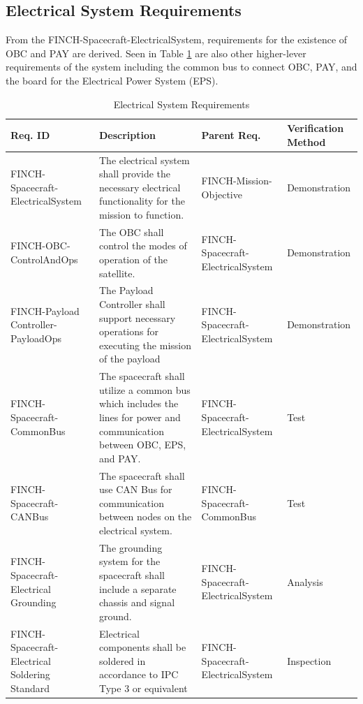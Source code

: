 \documentclass[12pt,a4paper]{article}
\begin{document}
    \subsection{Electrical System Requirements}
    From the FINCH-Spacecraft-ElectricalSystem, requirements for the existence of OBC and PAY are derived. Seen in Table \ref{tab:elec_sys_req} are also other higher-lever requirements of the system including the common bus to connect OBC, PAY, and the board for the Electrical Power System (EPS).
    \begin{table}[H]
        \centering
        \begin{tabular}{|>{\centering\arraybackslash}m{3cm} 
                    |>{\raggedright\arraybackslash}m{7cm} 
                    |>{\centering\arraybackslash}m{3cm} 
                    |>{\centering\arraybackslash}m{2.5cm}|}\hline
            \textbf{Req. ID} & \centering \textbf{Description} & \textbf{Parent Req.} & \textbf{Verification Method}\\\hline
             FINCH-Spacecraft-ElectricalSystem&  The electrical system shall provide the necessary electrical functionality for the mission to function. &  FINCH-Mission-Objective& Demonstration\\\hline
 FINCH-OBC-ControlAndOps& The OBC shall control the modes of operation of the satellite. & FINCH-Spacecraft-ElectricalSystem&Demonstration\\\hline
 FINCH-Payload Controller-PayloadOps& The Payload Controller shall support necessary operations for executing the mission of the payload& FINCH-Spacecraft-ElectricalSystem&Demonstration\\\hline
             FINCH-Spacecraft-CommonBus&  The spacecraft shall utilize a common bus which includes the lines for power and communication between OBC, EPS, and PAY. &  FINCH-Spacecraft-ElectricalSystem& Test\\\hline
             FINCH-Spacecraft-CANBus&  The spacecraft shall use CAN Bus for communication between nodes on the electrical system.&  FINCH-Spacecraft-CommonBus& Test\\\hline
             FINCH-Spacecraft-Electrical Grounding&  The grounding system for the spacecraft shall include a separate chassis and signal ground.&  FINCH-Spacecraft-ElectricalSystem& Analysis\\\hline
             FINCH-Spacecraft-Electrical Soldering Standard&  Electrical components shall be soldered in accordance to IPC Type 3 or equivalent&  FINCH-Spacecraft-ElectricalSystem& Inspection\\\hline
        \end{tabular}
        \caption{Electrical System Requirements}\label{tab:elec_sys_req}
    \end{table}
    
\end{document}
